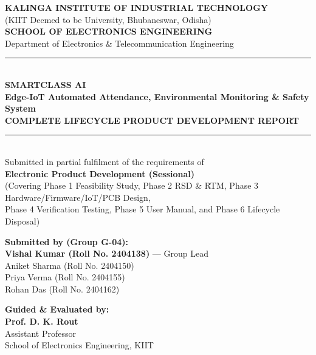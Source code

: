 \documentclass[11pt,a4paper]{article}
\begin{document}
\begin{titlepage}
\centering
{\large \textbf{KALINGA INSTITUTE OF INDUSTRIAL TECHNOLOGY}}\\[0.2cm]
{\small (KIIT Deemed to be University, Bhubaneswar, Odisha)}\\[0.3cm]
{\large \textbf{SCHOOL OF ELECTRONICS ENGINEERING}}\\[0.1cm]
{\normalsize Department of Electronics \& Telecommunication Engineering}\\[1.5cm]

\rule{\textwidth}{1.5pt}\\[0.4cm]
{\LARGE \textbf{SMARTCLASS AI}}\\[0.3cm]
{\large \textbf{Edge-IoT Automated Attendance, Environmental Monitoring \& Safety System}}\\[0.3cm]
{\Large \textbf{COMPLETE LIFECYCLE PRODUCT DEVELOPMENT REPORT}}\\[0.2cm]
\rule{\textwidth}{1.5pt}\\[1.2cm]

{\normalsize Submitted in partial fulfilment of the requirements of}\\[0.2cm]
{\large \textbf{Electronic Product Development (Sessional)}}\\[0.3cm]
{\small (Covering Phase 1 Feasibility Study, Phase 2 RSD \& RTM, Phase 3 Hardware/Firmware/IoT/PCB Design,\\
Phase 4 Verification Testing, Phase 5 User Manual, and Phase 6 Lifecycle Disposal)}\\[1.5cm]

\begin{minipage}[t]{0.55\textwidth}
\textbf{Submitted by (Group G-04):}\\[0.1cm]
\textbf{Vishal Kumar (Roll No. 2404138)} — Group Lead\\
Aniket Sharma (Roll No. 2404150)\\
Priya Verma (Roll No. 2404155)\\
Rohan Das (Roll No. 2404162)
\end{minipage}
\hfill
\begin{minipage}[t]{0.4\textwidth}
\begin{flushright}
\textbf{Guided \& Evaluated by:}\\[0.1cm]
\textbf{Prof. D. K. Rout}\\
Assistant Professor\\
School of Electronics Engineering, KIIT
\end{flushright}
\end{minipage}


\end{titlepage}
\end{document}
